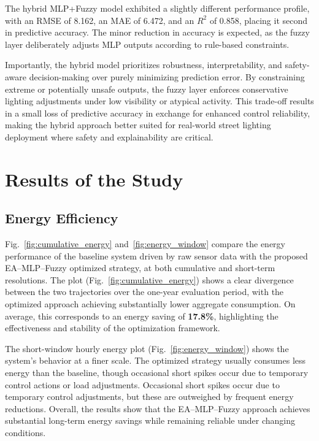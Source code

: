 \documentclass[conference]{IEEEtran}
\begin{document}
The hybrid MLP+Fuzzy model exhibited a slightly different performance profile, with an RMSE of 8.162, an MAE of 6.472, and an $R^2$ of 0.858, placing it second in predictive accuracy. The minor reduction in accuracy is expected, as the fuzzy layer deliberately adjusts MLP outputs according to rule-based constraints.

Importantly, the hybrid model prioritizes robustness, interpretability, and safety-aware decision-making over purely minimizing prediction error. By constraining extreme or potentially unsafe outputs, the fuzzy layer enforces conservative lighting adjustments under low visibility or atypical activity. This trade-off results in a small loss of predictive accuracy in exchange for enhanced control reliability, making the hybrid approach better suited for real-world street lighting deployment where safety and explainability are critical.

\section{Results of the Study}
\subsection{Energy Efficiency}

Fig.~\ref{fig:cumulative_energy} and~\ref{fig:energy_window} compare the energy performance of the baseline system driven by raw sensor data with the proposed EA--MLP--Fuzzy optimized strategy, at both cumulative and short-term resolutions. The plot (Fig.~\ref{fig:cumulative_energy}) shows a clear divergence between the two trajectories over the one-year evaluation period, with the optimized approach achieving substantially lower aggregate consumption. On average, this corresponds to an energy saving of \textbf{17.8\%}, highlighting the effectiveness and stability of the optimization framework.

The short-window hourly energy plot (Fig.~\ref{fig:energy_window}) shows the system’s behavior at a finer scale. The optimized strategy usually consumes less energy than the baseline, though occasional short spikes occur due to temporary control actions or load adjustments. Occasional short spikes occur due to temporary control adjustments, but these are outweighed by frequent energy reductions. Overall, the results show that the EA--MLP--Fuzzy approach achieves substantial long-term energy savings while remaining reliable under changing conditions.
\end{document}
